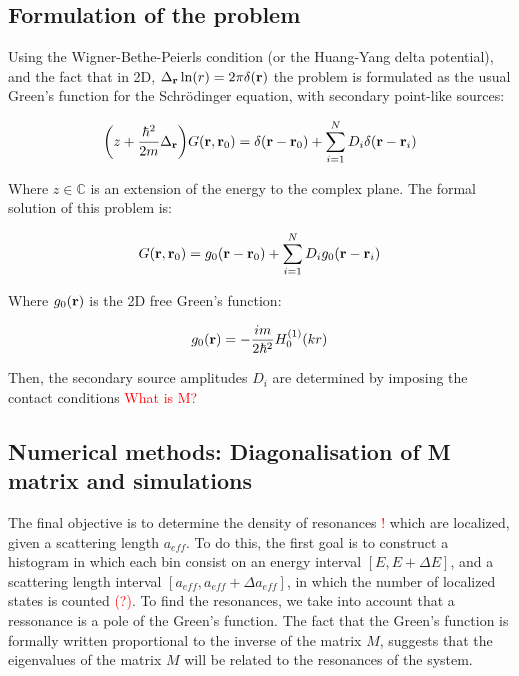 \subsection{Formulation of the problem}

Using the Wigner-Bethe-Peierls condition (or the Huang-Yang delta potential), and the fact that in 2D, $\Delta_{\vb{r}}\ln(r)=2\pi \delta(\vb{r})$ the problem is formulated as the usual Green's function for the Schrödinger equation, with secondary point-like sources:

\begin{equation}
    \qty(z+\frac{\hbar^2}{2m}\Delta_{\vb{r}})G(\vb{r},\vb{r}_0)=\delta(\vb{r}-\vb{r}_0)+\sum_{i=1}^N D_i\delta({\vb{r}-\vb{r}_i})
\end{equation}

Where $z\in\mathbb C$ is an extension of the energy to the complex plane. The formal solution of this problem is:

\begin{equation}
    G(\vb{r},\vb{r}_0)=g_0(\vb{r}-\vb{r}_0)+\sum_{i=1}^N D_i g_0(\vb{r}-\vb{r}_i)
\end{equation}

Where $g_0(\vb{r})$ is the 2D free Green's function:

\begin{equation}
    \label{eq:2d_free_gf}
    g_0(\vb{r})=-\frac{im}{2\hbar^2}H_0^{(1)}(kr)
\end{equation}

Then, the secondary source amplitudes $D_i$ are determined by imposing the contact conditions \textcolor{red}{What is M?}

\subsection{Numerical methods: Diagonalisation of M matrix and simulations}

The final objective is to determine the density of resonances \textcolor{red}{!} which are localized, given a scattering length $a_{eff}$. To do this, the first goal is to construct a histogram in which each bin consist on an energy interval $[E,E+\Delta E]$, and a scattering length interval $[a_{eff},a_{eff}+\Delta a_{eff}]$, in which the number of localized states is counted \textcolor{red}{(?)}. To find the resonances, we take into account that a ressonance is a pole of the Green's function. The fact that the Green's function is formally written proportional to the inverse of the matrix $M$, suggests that the eigenvalues of the matrix $M$ will be related to the resonances of the system.


